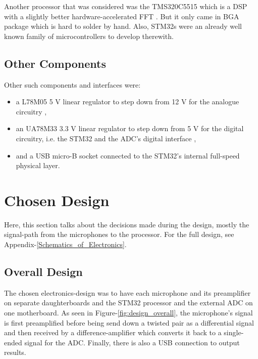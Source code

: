 \documentclass[notitlepage]{report}
\begin{document}
Another processor that was considered was the TMS320C5515 which is a DSP with a slightly better hardware-accelerated FFT \cite{noauthor_tms320c5515_2013} \cite{mckeown_fft_2013}. But it only came in BGA package which is hard to solder by hand. Also, STM32s were an already well known family of microcontrollers to develop therewith.

\subsection{Other Components}

Other such components and interfaces were:
\begin{itemize}
	\item a L78M05 5 \si{V} linear regulator to step down from 12 \si{V} for the analogue circuitry \cite{noauthor_precision_2020},
	\item an UA78M33 3.3 \si{V} linear regulator to step down from 5 \si{V} for the digital circuitry, i.e. the STM32 and the ADC's digital interface \cite{noauthor_a78mxx_2015},
	\item and a USB micro-B socket connected to the STM32's internal full-speed physical layer.
\end{itemize}

\section{Chosen Design}

Here, this section talks about the decisions made during the design, mostly the signal-path from the microphones to the processor. For the full design, see Appendix-\ref{Schematics_of_Electronics}.

\subsection{Overall Design}

The chosen electronics-design was to have each microphone and its preamplifier on separate daughterboards and the STM32 processor and the external ADC on one motherboard. As seen in Figure-\ref{fig:design_overall}, the microphone's signal is first preamplified before being send down a twisted pair as a differential signal and then received by a difference-amplifier which converts it back to a single-ended signal for the ADC. Finally, there is also a USB connection to output results.
\end{document}
